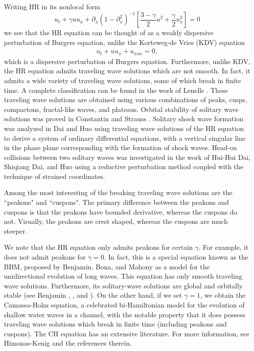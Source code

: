 \documentclass[12pt,reqno]{amsart}
\newcommand{\p}{\partial}
\begin{document}
Writing HR in its nonlocal form
$$
u_{t} + \gamma u u_{x}+ \p_{x} (1 - \p_{x}^{2})^{-1} \left [ \frac{3 - \gamma}{2}u^{2} + \frac{\gamma}{2} u_{x}^{2} \right ]=0
$$
we see that the HR equation can be thought of as a 
weakly dispersive perturbation of
Burgers equation, unlike the Korteweg-de Vries (KDV) equation
\begin{align}
     u_{t} + u u_{x} + u_{xxx}=0,
\end{align}
which is a dispersive perturbation of Burgers equation.
%
Furthermore, unlike KDV,
the HR equation admits traveling wave solutions which are not smooth. In fact,
it admits a wide variety of traveling wave solutions, some of which break in
finite time. A complete classification can be found in the work of Lenells
\cite{Lenells_2006_Traveling-waves}.  These traveling wave solutions are
obtained using various combinations of peaks, cusps, compactons, fractal-like
waves, and plateaus. Orbital stability of solitary wave solutions was proved in
Constantin and Strauss \cite{Constantin_2000_Stability-of-a-}.  Solitary shock wave formation was
analyzed in Dai and Huo \cite{Dai_2000_Solitary-shock-} using traveling wave
solutions of the HR equation to derive a system of ordinary differential
equations, with a vertical singular line in the phase plane corresponding with
the formation of shock waves. Head-on collisions between two solitary waves was
investigated in the work of Hui-Hui Dai, Shiqiang Dai, and Huo
\cite{Dai_2000_Head-on-collisi} using a reductive perturbation method coupled
with the technique of strained coordinates. 

Among the most interesting of the breaking
traveling wave solutions are the ``peakons" and
``cuspons". The primary difference between the peakons and cuspons is that the
peakons have bounded derivative, whereas the cuspons do not. Visually, the
peakons are crest shaped, whereas the cuspons are much steeper. 

We note that the HR equation only admits peakons for certain $\gamma$. 
For example, it does not admit peakons for $\gamma = 0$. In fact, this is a
special equation known as the BBM, proposed by 
Benjamin, Bona, and Mahony 
\cite{Benjamin_1972_Model-equations} as a model for 
the unidirectional evolution of long waves. This equation has only smooth
traveling wave solutions. Furthermore, 
its solitary-wave solutions are global and orbitally stable (see Benjamin 
\cite{Benjamin_1972_The-stability-o}, 
\cite{Benjamin_1972_Model-equations}, and 
\cite{Constantin_2000_Stability-of-a-}).
On the other hand, if we set $\gamma =1$, we obtain the Camassa-Holm equation, a celebrated bi-Hamiltonian
model for the evolution of shallow water waves in a channel, with the notable
property that it does possess traveling wave solutions which break in
finite time (including peakons and cuspons). The CH equation has an extensive
literature. For more information, see Himonas-Kenig \cite{Himonas:2010ch} and the references
therein.
\end{document}
